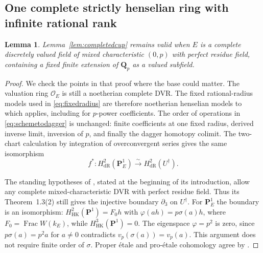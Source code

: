 \documentclass[11pt,a4paper]{article}
\newtheorem{lemma}[theorem]{Lemma}
\theoremstyle{remark}
\newcommand{\Q}{\mathbf Q}
\newcommand{\PP}{\mathbf P}
\newcommand{\OO}{\mathcal O}
\newcommand{\Frac}{\operatorname{Frac}}
\begin{document}
\subsection{One complete strictly henselian ring with infinite rational rank}

\begin{lemma}\label{lem:completedcupperfect}
Lemma~\ref{lem:completedcup} remains valid when $E$ is a complete
discretely valued field of mixed characteristic $(0,p)$ with perfect
residue field, containing a fixed finite extension of $\Q_p$ as a valued
subfield.
\end{lemma}
\begin{proof}
We check the points in that proof where the base could matter.
The valuation ring $\OO_E$ is still a noetherian complete DVR.
The fixed rational-radius models used in \eqref{eq:fixedradius}
are therefore noetherian henselian models to which
\cite[Theorem~6.2.1]{Achinger} applies, including for $p$-power coefficients.
The order of operations in \eqref{eq:schemetodagger} is unchanged:
finite coefficients at one fixed radius, derived inverse limit,
inversion of $p$, and finally the dagger homotopy colimit.
The two-chart calculation by integration of overconvergent series gives
the same isomorphism
\[
 f^*:H^2_{\mathrm{dR}}(\PP^1_E)
       \xrightarrow{\sim}H^2_{\mathrm{dR}}(U^\dagger).
\]

The standing hypotheses of \cite{ColmezNiziol}, stated at the beginning
of its introduction, allow any complete mixed-characteristic DVR with
perfect residue field. Thus its Theorem~1.3(2) still gives the injective
boundary $\partial_3$ on $U^\dagger$.
For $\PP^1_E$ the boundary is an isomorphism:
$H^2_{\mathrm{HK}}(\PP^1)=F_0h$ with
$\varphi(ah)=p\sigma(a)h$, where
$F_0=\Frac W(k_E)$, while $H^3_{\mathrm{HK}}(\PP^1)=0$.
The eigenspace $\varphi=p^2$ is zero, since
$p\sigma(a)=p^2a$ for $a\ne0$ contradicts
$v_p(\sigma(a))=v_p(a)$.
This argument does not require finite order of $\sigma$.
Proper \'etale and pro-\'etale cohomology agree by
\cite[Section~7.2.4]{ColmezNiziol}.


\end{proof}
\end{document}
